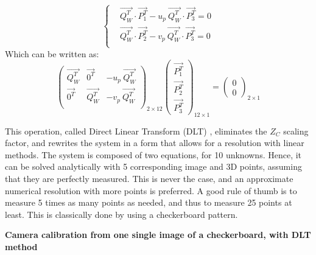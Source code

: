   \begin{equation}
    \begin{cases}
      & \overrightarrow{Q_W^T} \cdot \overrightarrow{P_1^T} - u_p \ \overrightarrow{Q_W^T} \cdot \overrightarrow{P_3^T} = 0\\
      & \overrightarrow{Q_W^T} \cdot \overrightarrow{P_2^T} - v_p \ \overrightarrow{Q_W^T} \cdot \overrightarrow{P_3^T} = 0\\
    \end{cases}
  \end{equation}
  Which can be written as:
  \begin{equation}\label{eq:calib}
    \boxed{
      \begin{pmatrix}
        \overrightarrow{Q_W^T} & \overrightarrow{0^T} & - u_p \ \overrightarrow{Q_W^T}\\   
        \overrightarrow{0^T} & \overrightarrow{Q_W^T} & - v_p \ \overrightarrow{Q_W^T} \\ 
      \end{pmatrix}_{\!\!2\times 12}
      \begin{pmatrix} \overrightarrow{P_1^T} \\ \overrightarrow{P_2^T} \\ \overrightarrow{P_3^T} \end{pmatrix}_{\!\!12\times 1}
      = \begin{pmatrix} 0 \\ 0 \end{pmatrix}_{\!\!2\times 1}
    }
  \end{equation}

This operation, called Direct Linear Transform (DLT) \cite{Sutherland1974}, eliminates the $Z_C$ scaling factor, and rewrites the system in a form that allows for a resolution with linear methods. The system is composed of two equations, for 10 unknowns. Hence, it can be solved analytically with 5 corresponding image and 3D points, assuming that they are perfectly measured. This is never the case, and an approximate numerical resolution with more points is preferred. A good rule of thumb is to measure 5 times as many points as needed, and thus to measure 25 points at least. This is classically done by using a checkerboard pattern. 

\vspace*{0.5cm}
\noindent\textbf{Camera calibration from one single image of a checkerboard, with DLT method}

